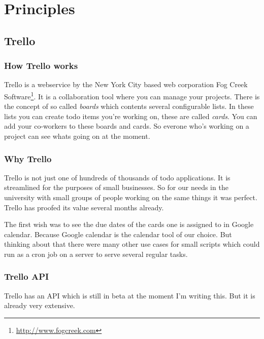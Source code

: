 
\chapter{Principles}
  \label{Principles}

\section{Trello}

\subsection{How Trello works}
Trello is a webservice by the New York City based web corporation Fog Creek Software\footnote{\url{http://www.fogcreek.com}}. It is a collaboration tool where you can manage your projects. There is the concept of so called \emph{boards} which contents several configurable lists. In these lists you can create todo items you're working on, these are called \emph{cards}. You can add your co-workers to these boards and cards. So everone who's working on a project can see whats going on at the moment.

\subsection{Why Trello}
Trello is not just one of hundreds of thousands of todo applications. It is streamlined for the purposes of small businesses. So for our needs in the university with small groups of people working on the same things it was perfect. Trello has proofed its value several months already.

The first wish was to see the due dates of the cards one is assigned to in Google calendar. Because Google calendar is the calendar tool of our choice. But thinking about that there were many other use cases for small scripts which could run as a cron job on a server to serve several regular tasks.

\subsection{Trello API}
Trello has an API  which is still in beta at the moment I'm writing this. But it is already very extensive. \cite{trello:docu}

